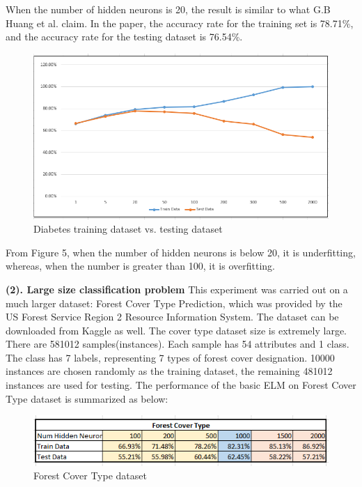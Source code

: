 \documentclass[a4paper, 14pt]{extarticle}
\begin{document}
When the number of hidden neurons is 20, the result is similar to what G.B Huang et al. claim. In the paper\cite{G.B.Huang-ICNN}, the accuracy rate for the training set is 78.71\%, and the accuracy rate for the testing dataset is 76.54\%. 
     \begin{figure}[H]
\centering
\includegraphics[width=\textwidth]{4.png}
\caption{\label{fig:trainingvstesting}Diabetes training dataset vs. testing dataset}
\end{figure}
 From Figure 5,  when the number of hidden neurons is below 20, it is underfitting, whereas, when the number is greater than 100, it is overfitting.\newline 
\par\textbf{(2). Large size classification problem}\newline\newline
This experiment was carried out on a much larger dataset: Forest Cover Type Prediction, which was provided by the US Forest Service Region 2 Resource Information System. The dataset can be downloaded from Kaggle as well. The cover type dataset size is extremely large. There are 581012 samples(instances). Each sample has 54 attributes and 1 class. The class has 7 labels, representing 7 types of forest cover designation. 10000 instances are chosen randomly as the training dataset, the remaining 481012 instances are used for testing. The performance of the basic ELM on Forest Cover Type dataset is summarized as below:
\begin{figure}[H]
\centering
\includegraphics[width=\textwidth]{5.png}
\caption{\label{fig:trainingvstesting}Forest Cover Type dataset}
\end{figure}
\end{document}
